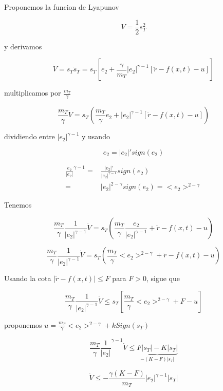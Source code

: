 \begin{flushright}
\end{flushright}

Proponemos la funcion de Lyapunov

\begin{equation*}
    V=\frac{1}{2}s_T^2
\end{equation*}

y derivamos

\begin{equation*}
  \dot{V}=s_T\dot{s}_T=s_T[e_2+\frac{\gamma}{m_T}|e_2|^{\gamma-1}[\ddot{r}-f(x,t)-u]]
\end{equation*}

multiplicamos por $\frac{m_T}{\gamma}$

\begin{equation*}
  \frac{m_T}{\gamma}\dot{V}=s_T(\frac{m_T}{\gamma}e_2+|e_2|^{\gamma-1}[\ddot{r}-f(x,t)-u])
\end{equation*}

dividiendo entre $|e_2|^{\gamma-1}$ y usando

\begin{equation*}
  e_2=|e_2|'sign(e_2)
\end{equation*}

\begin{equation*}
  \begin{aligned}
    \frac{e_2}{|e_2|}^{\gamma-1}=&\frac{|e_2|'}{|e_2|^{\gamma-1}}sign(e_2)\\
      =&|e_2|^{2-\gamma}sign(e_2)=<e_2>^{2-\gamma}
  \end{aligned}
\end{equation*}

Tenemos

\begin{equation*}
  \frac{m_T}{\gamma}\frac{1}{|e_2|^{\gamma-1}}\dot{V}=s_T(\frac{m_T}{\gamma}\frac{e_2}{|e_2|^{\gamma-1}}+\ddot{r}-f(x,t)-u)
\end{equation*}

\begin{equation*}
  \frac{m_T}{\gamma}\frac{1}{|e_2|^{\gamma-1}}\dot{V}=s_T(\frac{m_T}{\gamma}<e_2>^{2-\gamma}+\ddot{r}-f(x,t)-u)
\end{equation*}

Usando la cota $|\ddot{r}-f(x,t)|\leq F$ para $F>0$, sigue que

\begin{equation*}
  \frac{m_T}{\gamma}\frac{1}{|e_2|^{\gamma-1}}\dot{V}\leq s_T [\frac{m_T}{\gamma}<e_2>^{2-\gamma}+F-u]
\end{equation*}

proponemos $u=\frac{m_T}{\gamma}<e_2>^{2-\gamma}+kSign(s_T)$

\begin{equation*}
  \frac{m_T}{\gamma}\frac{1}{|e_2|}^{\gamma-1}\dot{V}\leq \underbrace{F|s_T|-K|s_T|}_{-(K-F)|s_T|}
\end{equation*}

\begin{equation*}
  \dot{V}\leq -\frac{\gamma(K-F)}{m_T}|e_2|^{\gamma-1}|s_T|
\end{equation*}
  
